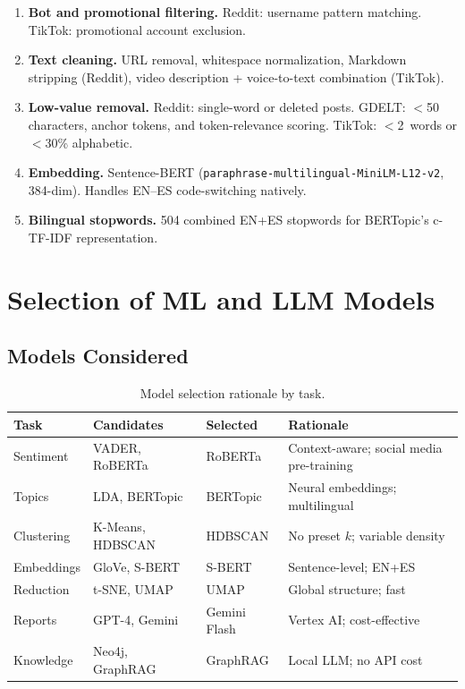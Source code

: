 \documentclass[12pt, a4paper]{article}
\begin{document}
\begin{enumerate}[leftmargin=*]
  \item \textbf{Bot and promotional filtering.}
        Reddit: username pattern matching. TikTok: promotional account exclusion.

  \item \textbf{Text cleaning.}
        URL removal, whitespace normalization, Markdown stripping (Reddit), video description + voice-to-text combination (TikTok).

  \item \textbf{Low-value removal.}
        Reddit: single-word or deleted posts. GDELT: $<$50 characters, anchor tokens, and token-relevance scoring. TikTok: $<$2~words or $<$30\% alphabetic.

  \item \textbf{Embedding.}
        Sentence-BERT (\texttt{paraphrase-multilingual-MiniLM-L12-v2}, 384-dim). Handles EN--ES code-switching natively.

  \item \textbf{Bilingual stopwords.}
        504 combined EN+ES stopwords for BERTopic's c-TF-IDF representation.
\end{enumerate}


\section{Selection of ML and LLM Models}
\label{sec:models}

\subsection{Models Considered}

\begin{table}[H]
\centering
\caption{Model selection rationale by task.}
\label{tab:model-comparison}
\begin{tabular}{@{}lllp{5cm}@{}}
\toprule
\textbf{Task} & \textbf{Candidates} & \textbf{Selected} & \textbf{Rationale} \\
\midrule
Sentiment   & VADER, RoBERTa    & RoBERTa      & Context-aware; social media pre-training \\[3pt]
Topics      & LDA, BERTopic     & BERTopic     & Neural embeddings; multilingual \\[3pt]
Clustering  & K-Means, HDBSCAN  & HDBSCAN      & No preset $k$; variable density \\[3pt]
Embeddings  & GloVe, S-BERT     & S-BERT       & Sentence-level; EN+ES \\[3pt]
Reduction   & t-SNE, UMAP       & UMAP         & Global structure; fast \\[3pt]
Reports     & GPT-4, Gemini     & Gemini Flash & Vertex AI; cost-effective \\[3pt]
Knowledge   & Neo4j, GraphRAG   & GraphRAG     & Local LLM; no API cost \\
\bottomrule
\end{tabular}
\end{table}
\end{document}
